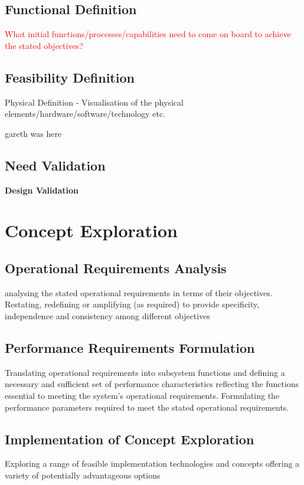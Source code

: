 \documentclass[a4paper,11pt,fleqn]{report}
\begin{document}
\subsection{Functional Definition}
\textcolor{red}{What initial functions/processes/capabilities need to come on board to
achieve the stated objectives?}\\


\subsection{Feasibility Definition}
Physical Definition - Visualisation of the physical elements/hardware/software/technology
etc. 

gareth was here

\subsection{Need Validation}
\textbf{Design Validation}

\section{Concept Exploration}
\subsection{Operational Requirements Analysis}
analysing the stated operational requirements in terms of their
objectives. Restating, redefining or amplifying (as required) to provide
specificity, independence and consistency among different
objectives

\subsection{Performance Requirements Formulation}
Translating operational requirements into subsystem functions and defining a necessary and sufficient set of performance characteristics reflecting the functions essential to meeting the system’s operational requirements. Formulating the performance parameters required to meet the stated operational requirements.

\subsection{Implementation of Concept Exploration}
Exploring a range of feasible implementation technologies and concepts offering a variety of potentially advantageous options 
\end{document}

